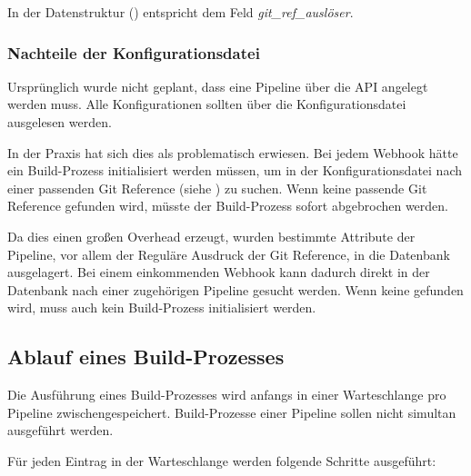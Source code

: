 In der Datenstruktur () entspricht dem Feld \emph{git\_ref\_auslöser}.

\subsubsection{Nachteile der Konfigurationsdatei}

Ursprünglich wurde nicht geplant, dass eine Pipeline über die API angelegt werden muss. Alle Konfigurationen sollten über die Konfigurationsdatei ausgelesen werden.

In der Praxis hat sich dies als problematisch erwiesen. Bei jedem Webhook hätte ein Build-Prozess initialisiert werden müssen, um in der Konfigurationsdatei nach einer passenden Git Reference (siehe ) zu suchen. Wenn keine passende Git Reference gefunden wird, müsste der Build-Prozess sofort abgebrochen werden.

Da dies einen großen Overhead erzeugt, wurden bestimmte Attribute der Pipeline, vor allem der Reguläre Ausdruck der Git Reference, in die Datenbank ausgelagert. Bei einem einkommenden Webhook kann dadurch direkt in der Datenbank nach einer zugehörigen Pipeline gesucht werden. Wenn keine gefunden wird, muss auch kein Build-Prozess initialisiert werden.

\subsection{Ablauf eines Build-Prozesses}
\label{subsec:ablauf-build}

Die Ausführung eines Build-Prozesses wird anfangs in einer Warteschlange pro Pipeline zwischengespeichert. Build-Prozesse einer Pipeline sollen nicht simultan ausgeführt werden.

Für jeden Eintrag in der Warteschlange werden folgende Schritte ausgeführt:

